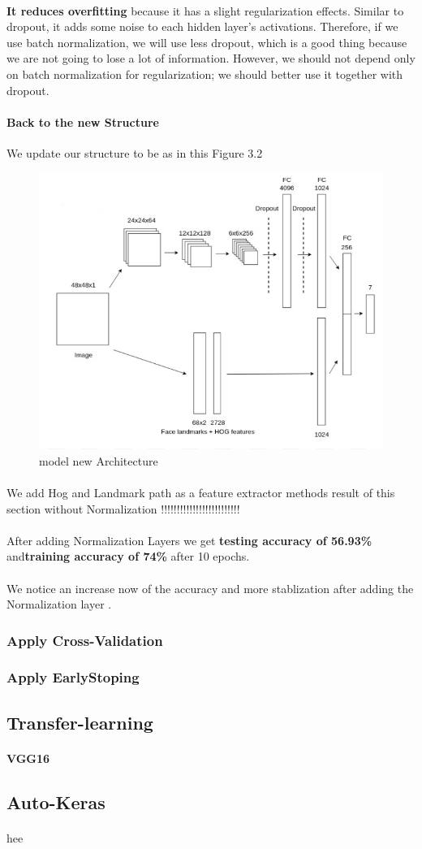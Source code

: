 \paragraph{}
\textbf{It reduces overfitting}
because it has a slight regularization effects. Similar to dropout, it adds some noise to each hidden layer’s activations. Therefore, if we use batch normalization, we will use less dropout, which is a good thing because we are not going to lose a lot of information. However, we should not depend only on batch normalization for regularization; we should better use it together with dropout.
\paragraph{Back to the new Structure}
We update our structure to be as in this Figure 3.2
\begin{figure}
	\centering
	\includegraphics[width=.5\textwidth]{Arch.png}
	\caption{model new Architecture}
\end{figure} 
\paragraph{}
We add Hog and Landmark path as a feature extractor methods 
result of this section without Normalization
!!!!!!!!!!!!!!!!!!!!!!!!!
\paragraph{}
After adding Normalization Layers we get \textbf{testing accuracy of 56.93\%} and\textbf{training accuracy of 74\%} after 10 epochs. 
\paragraph{}
We notice an increase now of the accuracy and more stablization after adding the Normalization layer .
\subsubsection{Apply Cross-Validation}
\subsubsection{Apply EarlyStoping}
 
\subsection{Transfer-learning}
\paragraph{VGG16}
\subsection{Auto-Keras}
\paragraph{}
hee
